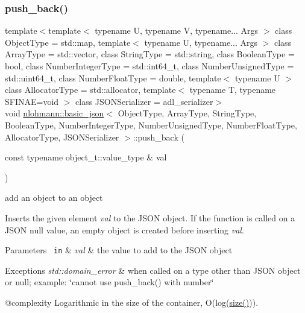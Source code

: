 \subsubsection{\texorpdfstring{push\_back()}{push\_back()}\hspace{0.1cm}{\footnotesize\ttfamily [3/4]}}
{\footnotesize\ttfamily template$<$template$<$ typename U, typename V, typename... Args $>$ class Object\+Type = std\+::map, template$<$ typename U, typename... Args $>$ class Array\+Type = std\+::vector, class String\+Type  = std\+::string, class Boolean\+Type  = bool, class Number\+Integer\+Type  = std\+::int64\+\_\+t, class Number\+Unsigned\+Type  = std\+::uint64\+\_\+t, class Number\+Float\+Type  = double, template$<$ typename U $>$ class Allocator\+Type = std\+::allocator, template$<$ typename T, typename S\+F\+I\+N\+A\+E=void $>$ class J\+S\+O\+N\+Serializer = adl\+\_\+serializer$>$ \\
void \mbox{\hyperlink{classnlohmann_1_1basic__json}{nlohmann\+::basic\+\_\+json}}$<$ Object\+Type, Array\+Type, String\+Type, Boolean\+Type, Number\+Integer\+Type, Number\+Unsigned\+Type, Number\+Float\+Type, Allocator\+Type, J\+S\+O\+N\+Serializer $>$\+::push\+\_\+back (\begin{DoxyParamCaption}\item[{const typename object\+\_\+t\+::value\+\_\+type \&}]{val }\end{DoxyParamCaption})\hspace{0.3cm}{\ttfamily [inline]}}



add an object to an object 

Inserts the given element {\itshape val} to the J\+S\+ON object. If the function is called on a J\+S\+ON null value, an empty object is created before inserting {\itshape val}.


\begin{DoxyParams}[1]{Parameters}
\mbox{\texttt{ in}}  & {\em val} & the value to add to the J\+S\+ON object\\
\hline
\end{DoxyParams}

\begin{DoxyExceptions}{Exceptions}
{\em std\+::domain\+\_\+error} & when called on a type other than J\+S\+ON object or null; example\+: {\ttfamily \char`\"{}cannot use push\+\_\+back() with number\char`\"{}}\\
\hline
\end{DoxyExceptions}
@complexity Logarithmic in the size of the container, O(log({\ttfamily \mbox{\hyperlink{classnlohmann_1_1basic__json_a25e27ad0c6d53c01871c5485e1f75b96}{size()}}})).

